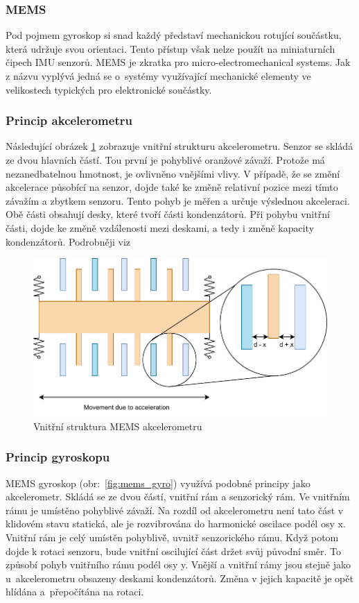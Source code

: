 \subsubsection*{MEMS}
Pod pojmem gyroskop si snad každý představí mechanickou rotující součástku, která udržuje svou orientaci. Tento přístup však nelze použít na miniaturních čipech IMU senzorů. MEMS je zkratka pro micro-electromechanical systems. Jak z názvu vyplývá jedná se o~systémy využívající mechanické elementy ve velikostech typických pro elektronické součástky.~\cite[str:~2-3]{mems_acc}

\subsubsection*{Princip akcelerometru}
Následující obrázek \ref{fig:mems_acc} zobrazuje vnitřní strukturu akcelerometru. Senzor se skládá ze dvou hlavních částí. Tou první je pohyblivé oranžové závaží. Protože má nezanedbatelnou hmotnost, je ovlivněno vnějšími vlivy. V případě, že se změní akcelerace působící na senzor, dojde také ke změně relativní pozice mezi tímto závažím a zbytkem senzoru. Tento pohyb je měřen a určuje výslednou akceleraci. Obě části obsahují desky, které tvoří části kondenzátorů. Při pohybu vnitřní části, dojde ke změně vzdálenosti mezi deskami, a tedy i změně kapacity kondenzátorů. Podrobněji viz \cite[str:~4-5]{mems_acc}

\begin{figure}[h!]
	\centering
	\includegraphics[scale=0.8]{obrazky-figures/accelerometer.pdf}
	\caption{Vnitřní struktura MEMS akcelerometru}
	\label{fig:mems_acc}
\end{figure}

\subsubsection{Princip gyroskopu}
MEMS gyroskop (obr:~\ref{fig:mems_gyro}) využívá podobné principy jako akcelerometr. Skládá se ze dvou částí, vnitřní rám a senzorický rám. Ve vnitřním rámu je umístěno pohyblivé závaží. Na rozdíl od akcelerometru není tato část v klidovém stavu statická, ale je rozvibrována do harmonické oscilace podél osy x.
Vnitřní rám je celý umístěn pohyblivě, uvnitř senzorického rámu. Když potom dojde k rotaci senzoru, bude vnitřní oscilující část držet svůj původní směr. To způsobí pohyb vnitřního rámu podél osy y. Vnější a vnitřní rámy jsou stejně jako u~akcelerometru obsazeny deskami kondenzátorů. Změna v jejich kapacitě je opět hlídána a~přepočítána na rotaci. \cite{mems_gyro}

